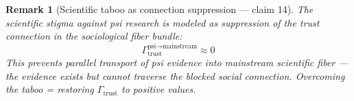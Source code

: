 \documentclass[11pt,a4paper]{article}
\newtheorem{remark}[definition]{Remark}
\begin{document}
\begin{remark}[Scientific taboo as connection suppression --- claim 14]
The scientific stigma against psi research is modeled as suppression
of the trust connection in the sociological fiber bundle:
\[
  \Gamma_{\text{trust}}^{\text{psi} \to \text{mainstream}} \approx 0
\]
This prevents parallel transport of psi evidence into mainstream
scientific fiber --- the evidence exists but cannot traverse the
blocked social connection. Overcoming the taboo = restoring
$\Gamma_{\text{trust}}$ to positive values.
\end{remark}
\end{document}
